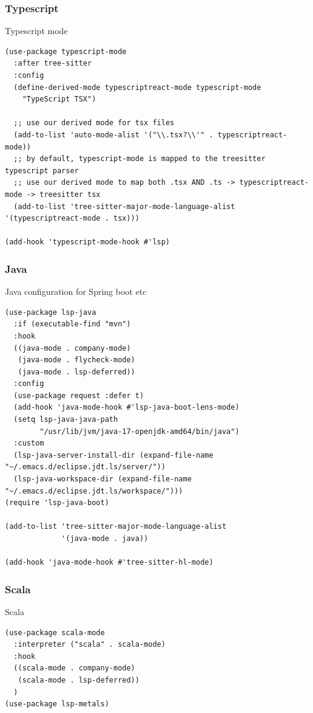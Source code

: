 \documentclass[11pt]{article}
\begin{document}
\subsubsection{Typescript}
\label{sec:org78a9935}

Typescript mode 

\begin{verbatim}
(use-package typescript-mode
  :after tree-sitter
  :config
  (define-derived-mode typescriptreact-mode typescript-mode
    "TypeScript TSX")

  ;; use our derived mode for tsx files
  (add-to-list 'auto-mode-alist '("\\.tsx?\\'" . typescriptreact-mode))
  ;; by default, typescript-mode is mapped to the treesitter typescript parser
  ;; use our derived mode to map both .tsx AND .ts -> typescriptreact-mode -> treesitter tsx
  (add-to-list 'tree-sitter-major-mode-language-alist '(typescriptreact-mode . tsx)))

(add-hook 'typescript-mode-hook #'lsp)
\end{verbatim}

\subsubsection{Java}
\label{sec:orgc2ebd85}

Java configuration for Spring boot etc

\begin{verbatim}
(use-package lsp-java
  :if (executable-find "mvn")
  :hook
  ((java-mode . company-mode)
   (java-mode . flycheck-mode)
   (java-mode . lsp-deferred))
  :config
  (use-package request :defer t)
  (add-hook 'java-mode-hook #'lsp-java-boot-lens-mode)
  (setq lsp-java-java-path
        "/usr/lib/jvm/java-17-openjdk-amd64/bin/java")
  :custom
  (lsp-java-server-install-dir (expand-file-name "~/.emacs.d/eclipse.jdt.ls/server/"))
  (lsp-java-workspace-dir (expand-file-name "~/.emacs.d/eclipse.jdt.ls/workspace/")))
(require 'lsp-java-boot)

(add-to-list 'tree-sitter-major-mode-language-alist
             '(java-mode . java))

(add-hook 'java-mode-hook #'tree-sitter-hl-mode)
\end{verbatim}

\subsubsection{Scala}
\label{sec:org34d2282}
Scala
\begin{verbatim}
(use-package scala-mode
  :interpreter ("scala" . scala-mode)
  :hook
  ((scala-mode . company-mode)
   (scala-mode . lsp-deferred))
  )
(use-package lsp-metals)

\end{verbatim}
\end{document}
